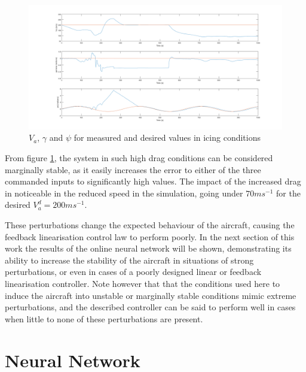 \begin{figure}[H]
\centering
\includegraphics[width=1\textwidth]{Figures/Results/ref_icing.PNG}
\caption[Reference following in icing conditions]{$V_a$, $\gamma$ and $\psi$ for measured and desired values in icing conditions}
\label{fig:ref_icing}
\end{figure}

From figure \ref{fig:ref_icing}, the system in such high drag conditions can be considered marginally stable, as it easily increases the error to either of the three commanded inputs to significantly high values. The impact of the increased drag in noticeable in the reduced speed in the simulation, going under $70ms^{-1}$ for the desired $V_a^d=200ms^{-1}$.



These perturbations change the expected behaviour of the aircraft, causing the feedback linearisation control law to perform poorly. In the next section of this work the results of the online neural network will be shown, demonstrating its ability to increase the stability of the aircraft in situations of strong perturbations, or even in cases of a poorly designed linear or feedback linearisation controller. Note however that that the conditions used here to induce the aircraft into unstable or marginally stable conditions mimic extreme perturbations, and the described controller can be said to perform well in cases when little to none of these perturbations are present.


\section{Neural Network}
\label{section:results/NN}

